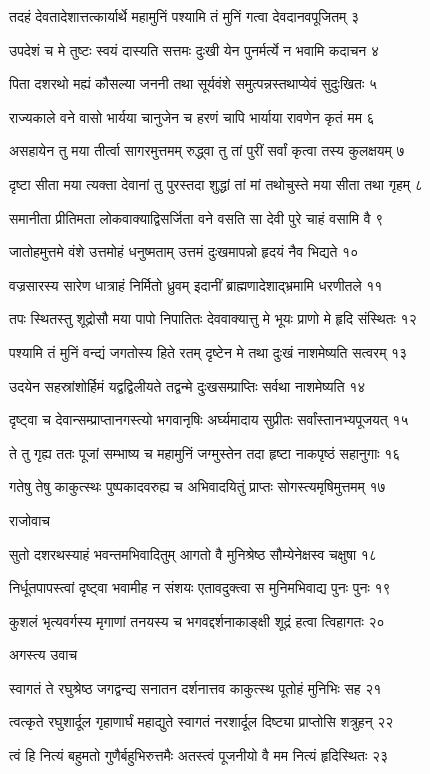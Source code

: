 तदहं देवतादेशात्तत्कार्यार्थे महामुनिं
पश्यामि तं मुनिं गत्वा देवदानवपूजितम् ३

उपदेशं च मे तुष्टः स्वयं दास्यति सत्तमः
दुःखी येन पुनर्मर्त्ये न भवामि कदाचन ४

पिता दशरथो मह्यं कौसल्या जननी तथा
सूर्यवंशे समुत्पन्नस्तथाप्येवं सुदुःखितः ५

राज्यकाले वने वासो भार्यया चानुजेन च
हरणं चापि भार्याया रावणेन कृतं मम ६

असहायेन तु मया तीर्त्वा सागरमुत्तमम्
रुद्ध्वा तु तां पुरीं सर्वां कृत्वा तस्य कुलक्षयम् ७

दृष्टा सीता मया त्यक्ता देवानां तु पुरस्तदा
शुद्धां तां मां तथोचुस्ते मया सीता तथा गृहम् ८

समानीता प्रीतिमता लोकवाक्याद्विसर्जिता
वने वसति सा देवी पुरे चाहं वसामि वै ९

जातोहमुत्तमे वंशे उत्तमोहं धनुष्मताम्
उत्तमं दुःखमापन्नो हृदयं नैव भिद्यते १०

वज्रसारस्य सारेण धात्राहं निर्मितो ध्रुवम्
इदानीं ब्राह्मणादेशाद्भ्रमामि धरणीतले ११

तपः स्थितस्तु शूद्रोसौ मया पापो निपातितः
देववाक्यात्तु मे भूयः प्राणो मे हृदि संस्थितः १२

पश्यामि तं मुनिं वन्द्यं जगतोस्य हिते रतम्
दृष्टेन मे तथा दुःखं नाशमेष्यति सत्वरम् १३

उदयेन सहस्रांशोर्हिमं यद्वद्विलीयते
तद्वन्मे दुःखसम्प्राप्तिः सर्वथा नाशमेष्यति १४

दृष्ट्वा च देवान्सम्प्राप्तानगस्त्यो भगवानृषिः
अर्घ्यमादाय सुप्रीतः सर्वांस्तानभ्यपूजयत् १५

ते तु गृह्य ततः पूजां सम्भाष्य च महामुनिं
जग्मुस्तेन तदा हृष्टा नाकपृष्ठं सहानुगाः १६

गतेषु तेषु काकुत्स्थः पुष्पकादवरुह्य च
अभिवादयितुं प्राप्तः सोगस्त्यमृषिमुत्तमम् १७

राजोवाच

सुतो दशरथस्याहं भवन्तमभिवादितुम्
आगतो वै मुनिश्रेष्ठ सौम्येनेक्षस्व चक्षुषा १८

निर्धूतपापस्त्वां दृष्ट्वा भवामीह न संशयः
एतावदुक्त्वा स मुनिमभिवाद्य पुनः पुनः १९

कुशलं भृत्यवर्गस्य मृगाणां तनयस्य च
भगवद्दर्शनाकाङ्क्षी शूद्रं हत्वा त्विहागतः २०

अगस्त्य उवाच

स्वागतं ते रघुश्रेष्ठ जगद्वन्द्य सनातन
दर्शनात्तव काकुत्स्थ पूतोहं मुनिभिः सह २१

त्वत्कृते रघुशार्दूल गृहाणार्घं महाद्युते
स्वागतं नरशार्दूल दिष्ट्या प्राप्तोसि शत्रुहन् २२

त्वं हि नित्यं बहुमतो गुणैर्बहुभिरुत्तमैः
अतस्त्वं पूजनीयो वै मम नित्यं हृदिस्थितः २३

